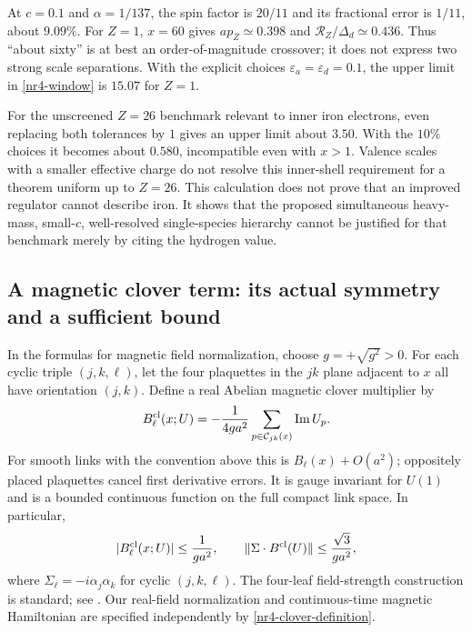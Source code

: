 At $c=0.1$ and $\alpha=1/137$, the spin factor is $20/11$ and its
fractional error is $1/11$, about $9.09\%$. For $Z=1$, $x=60$ gives
$ap_Z\simeq0.398$ and $\mathcal R_Z/\Delta_d\simeq0.436$.
Thus ``about sixty'' is at best an order-of-magnitude crossover;
it does not express two strong scale separations. With the explicit
choices $\varepsilon_a=\varepsilon_d=0.1$, the upper limit in
\eqref{nr4-window} is $15.07$ for $Z=1$.

For the unscreened $Z=26$ benchmark relevant to inner iron electrons,
even replacing both tolerances by $1$ gives an upper limit about $3.50$.
With the $10\%$ choices it becomes about $0.580$, incompatible even
with $x>1$. Valence scales with a smaller effective charge do not
resolve this inner-shell requirement for a theorem uniform up to
$Z=26$. This calculation does not prove that an improved regulator
cannot describe iron. It shows that the proposed simultaneous
heavy-mass, small-$c$, well-resolved single-species hierarchy cannot
be justified for that benchmark merely by citing the hydrogen value.

\subsection{A magnetic clover term: its actual symmetry and a sufficient bound}
\label{nr4-clover}

In the formulas for magnetic field normalization, choose
$g=+\sqrt{g^2}>0$.
For each cyclic triple $(j,k,\ell)$, let the four plaquettes in the
$jk$ plane adjacent to $x$ all have orientation $(j,k)$. Define a real
Abelian magnetic clover multiplier by
\begin{equation}
 B_\ell^{\rm cl}(x;U)
 =-\frac1{4ga^2}\sum_{p\in\mathcal C_{jk}(x)}\operatorname{Im}U_p.
 \label{nr4-clover-definition}
\end{equation}
For smooth links with the convention above this is $B_\ell(x)+O(a^2)$;
oppositely placed plaquettes cancel first derivative errors. It is
gauge invariant for $U(1)$ and is a bounded continuous function on
the full compact link space. In particular,
\begin{equation}
 |B_\ell^{\rm cl}(x;U)|\le\frac1{ga^2},\qquad
 \|\Sigma\cdot B^{\rm cl}(U)\|\le\frac{\sqrt3}{ga^2},
 \label{nr4-clover-norm}
\end{equation}
where $\Sigma_\ell=-i\alpha_j\alpha_k$ for cyclic $(j,k,\ell)$.
The four-leaf field-strength construction is standard; see
\cite[Eq.~(2.12)]{EKM}. Our real-field normalization and continuous-time
magnetic Hamiltonian are specified independently by
\eqref{nr4-clover-definition}.

